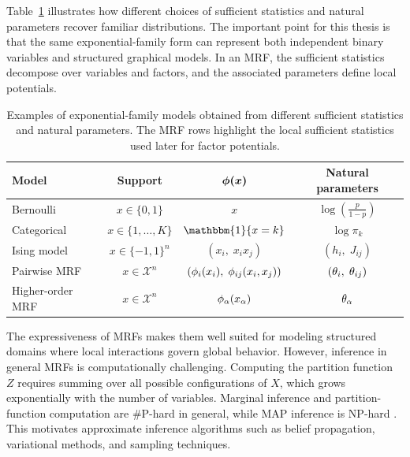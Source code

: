 Table~\ref{tab:exp_family_examples} illustrates how different choices of sufficient statistics and natural parameters recover familiar distributions. The important point for this thesis is that the same exponential-family form can represent both independent binary variables and structured graphical models. In an MRF, the sufficient statistics decompose over variables and factors, and the associated parameters define local potentials.

\begin{table}[htbp]
\centering
\begin{tabular}{lccc}
\toprule
\textbf{Model} & \textbf{Support} & $\boldsymbol{\phi(x)}$ & \textbf{Natural parameters} \\
\midrule

Bernoulli & $x \in \{0,1\}$ 
& $x$ 
& $\log\!\left(\frac{p}{1-p}\right)$ \\

Categorical & $x \in \{1,\dots,K\}$ 
& $\mathbbm{1}\{x=k\}$ 
& $\log \pi_k$ \\

Ising model & $x \in \{-1,1\}^n$ 
& $(x_i,\; x_i x_j)$ 
& $(h_i,\; J_{ij})$ \\

Pairwise MRF & $x \in \mathcal{X}^n$ 
& $(\phi_i(x_i),\; \phi_{ij}(x_i,x_j))$ 
& $(\theta_i,\; \theta_{ij})$ \\

Higher-order MRF & $x \in \mathcal{X}^n$ 
& $\phi_{\alpha}(x_{\alpha})$ 
& $\theta_{\alpha}$ \\

\bottomrule
\end{tabular}
\caption{Examples of exponential-family models obtained from different sufficient statistics and natural parameters. The MRF rows highlight the local sufficient statistics used later for factor potentials.}
\label{tab:exp_family_examples}
\end{table}



The expressiveness of MRFs makes them well suited for modeling structured domains where local interactions govern global behavior. However, inference in general MRFs is computationally challenging. Computing the partition function $Z$ requires summing over all possible configurations of $X$, which grows exponentially with the number of variables. Marginal inference and partition-function computation are \#P-hard in general, while MAP inference is NP-hard \citep{chandrasekaran_complexity_2008,schrijver_combinatorial_2003}. This motivates approximate inference algorithms such as belief propagation, variational methods, and sampling techniques.

